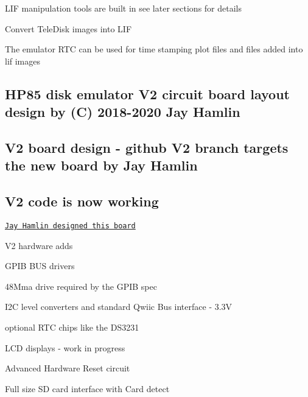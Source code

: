 L\+IF manipulation tools are built in see later sections for details
\begin{DoxyItemize}
\item Convert Tele\+Disk images into L\+IF
\item The emulator R\+TC can be used for time stamping plot files and files added into lif images
\end{DoxyItemize}





\subsection*{H\+P85 disk emulator V2 circuit board layout design by (C) 2018-\/2020 Jay Hamlin}

\subsection*{V2 board design -\/ github V2 branch targets the new board by Jay Hamlin}

\subsection*{V2 code is now working}


\begin{DoxyItemize}
\item \href{board/V2/releases}{\tt Jay Hamlin designed this board}
\item V2 hardware adds
\begin{DoxyItemize}
\item G\+P\+IB B\+US drivers
\begin{DoxyItemize}
\item 48\+Mma drive required by the G\+P\+IB spec
\end{DoxyItemize}
\item I2C level converters and standard Qwiic Bus interface -\/ 3.\+3V
\begin{DoxyItemize}
\item optional R\+TC chips like the D\+S3231
\item L\+CD displays -\/ work in progress
\end{DoxyItemize}
\item Advanced Hardware Reset circuit
\item Full size SD card interface with Card detect
\end{DoxyItemize}
\end{DoxyItemize}

